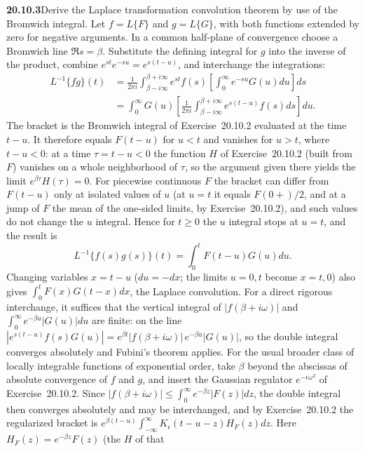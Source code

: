 \par\bigskip
\noindent\textbf{20.10.3}\quad Derive the Laplace transformation
convolution theorem by use of the Bromwich integral.
\solution
Let $f=L\{F\}$ and $g=L\{G\}$, with both functions
extended by zero for negative arguments. In a common
half-plane of convergence choose a Bromwich line $\Re s=\beta$.
Substitute the defining integral for $g$ into the inverse of
the product, combine $e^{st}e^{-su}=e^{s(t-u)}$, and
interchange the integrations:
\begin{align*}
L^{-1}\{fg\}(t)
&=\frac1{2\pi i}\int_{\beta-i\infty}^{\beta+i\infty}
e^{st}f(s)\left[\int_0^\infty e^{-su}G(u)du\right]ds\\
&=\int_0^\infty G(u)\left[
\frac1{2\pi i}\int_{\beta-i\infty}^{\beta+i\infty}
e^{s(t-u)}f(s)ds\right]du.
\end{align*}
The bracket is the Bromwich integral of Exercise~20.10.2
evaluated at the time $t-u$. It therefore equals $F(t-u)$ for
$u<t$ and vanishes for $u>t$, where $t-u<0$: at a time
$\tau=t-u<0$ the function $H$ of Exercise~20.10.2 (built from
$F$) vanishes on a whole neighborhood of $\tau$, so the
argument given there yields the limit $e^{\beta\tau}H(\tau)=0$.
For piecewise continuous $F$ the bracket can differ from
$F(t-u)$ only at isolated values of $u$ (at $u=t$ it equals
$F(0+)/2$, and at a jump of $F$ the mean of the one-sided
limits, by Exercise~20.10.2), and such values do not change
the $u$ integral. Hence for $t\ge0$ the $u$ integral stops at
$u=t$, and the result is
\[
\boxed{L^{-1}\{f(s)g(s)\}(t)=\int_0^tF(t-u)G(u)du}.
\]
Changing variables $x=t-u$ ($du=-dx$; the limits $u=0,t$
become $x=t,0$) also gives
$\int_0^tF(x)G(t-x)dx$, the Laplace convolution.
For a direct rigorous interchange, it suffices that the
vertical integral of $|f(\beta+i\omega)|$ and
$\int_0^\infty e^{-\beta u}|G(u)|du$ are finite: on the line
$|e^{s(t-u)}f(s)G(u)|=e^{\beta t}|f(\beta+i\omega)|\,
e^{-\beta u}|G(u)|$, so the double integral converges
absolutely and Fubini's theorem applies.
For the usual broader class of locally integrable functions
of exponential order, take $\beta$ beyond the abscissas of
absolute convergence of $f$ and $g$, and insert the Gaussian
regulator $e^{-\epsilon\omega^2}$ of Exercise~20.10.2. Since
$|f(\beta+i\omega)|\le\int_0^\infty e^{-\beta z}|F(z)|dz$, the
double integral then converges absolutely and may be
interchanged, and by Exercise~20.10.2 the regularized bracket
is $e^{\beta(t-u)}\int_{-\infty}^{\infty}K_\epsilon(t-u-z)
H_F(z)dz$. Here $H_F(z)=e^{-\beta z}F(z)$ (the $H$ of that
